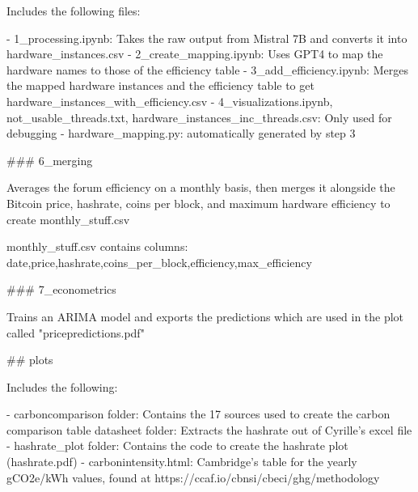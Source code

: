 Includes the following files:

- 1_processing.ipynb: Takes the raw output from Mistral 7B and converts it into hardware_instances.csv
- 2_create_mapping.ipynb: Uses GPT4 to map the hardware names to those of the efficiency table
- 3_add_efficiency.ipynb: Merges the mapped hardware instances and the efficiency table to get hardware_instances_with_efficiency.csv
- 4_visualizations.ipynb, not_usable_threads.txt, hardware_instances_inc_threads.csv: Only used for debugging
- hardware_mapping.py: automatically generated by step 3

### 6_merging

Averages the forum efficiency on a monthly basis, then merges it alongside the Bitcoin price, hashrate, coins per block, and maximum hardware efficiency to create monthly_stuff.csv

monthly_stuff.csv contains columns: date,price,hashrate,coins_per_block,efficiency,max_efficiency

### 7_econometrics

Trains an ARIMA model and exports the predictions which are used in the plot called "pricepredictions.pdf"


## plots

Includes the following:

- carboncomparison folder: Contains the 17 sources used to create the carbon comparison table
datasheet folder: Extracts the hashrate out of Cyrille's excel file
- hashrate_plot folder: Contains the code to create the hashrate plot (hashrate.pdf)
- carbonintensity.html: Cambridge's table for the yearly gCO2e/kWh values, found at https://ccaf.io/cbnsi/cbeci/ghg/methodology
